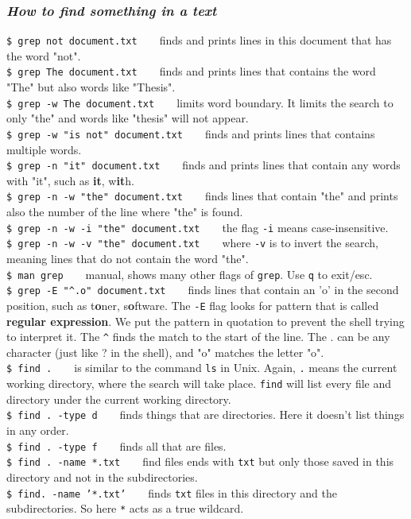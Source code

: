 \documentclass{article}
\begin{document}
\subsubsection{\small\textsl{How to find something in a text }}
\texttt{\$ grep not document.txt} ~ ~ finds and prints lines in this document that has the word "not".\\
\texttt{\$ grep The document.txt} ~ ~ finds and prints lines that contains the word "The" but also words like "Thesis".\\
\texttt{\$ grep -w The document.txt} ~ ~ limits word boundary. It limits the search to only "the" and words like "thesis" will not appear.\\ 
\texttt{\$ grep -w "is not" document.txt} ~ ~ finds and prints lines that contains multiple words. \\
\texttt{\$ grep -n "it" document.txt} ~ ~ finds and prints lines that contain any words with "it", such as \textbf{it}, w\textbf{it}h.\\
\texttt{\$ grep -n -w "the" document.txt}  ~ ~ finds lines that contain "the" and prints also the number of the line where "the" is found.\\
\texttt{\$ grep -n -w -i "the" document.txt} ~ ~ the flag \texttt{-i} means case-insensitive.\\
\texttt{\$ grep -n -w -v "the" document.txt} ~ ~ where \texttt{-v} is to invert the search, meaning lines that do not contain the word "the".\\
\texttt{\$ man grep} ~ ~ manual, shows many other flags of \texttt{grep}. Use \texttt{q} to exit/esc.\\ 
\texttt{\$ grep -E "\textasciicircum.o" document.txt} ~ ~ finds lines that contain an 'o' in the second position, such as t\textbf{o}ner, s\textbf{o}ftware. The \texttt{-E} flag looks for pattern that is called \textbf{regular expression}. We put the pattern in quotation to prevent the shell trying to interpret it. The \texttt{\textasciicircum} finds the match to the start of the line. The . can be any character (just like ? in the shell), and "o" matches the letter "o". \\
\texttt{\$ find .} ~ ~ is similar to the command \texttt{ls} in Unix. Again, \texttt{.} means the current working directory, where the search will take place. \texttt{find} will list every file and directory under the current working directory.\\
\texttt{\$ find . -type d} ~ ~ finds things that are directories. Here it doesn't list things in any order.\\
\texttt{\$ find . -type f} ~ ~ finds all that are files.\\
\texttt{\$ find . -name *.txt} ~ ~ find files ends with \texttt{txt} but only those saved in this directory and not in the subdirectories. \\
\texttt{\$ find. -name '*.txt'} ~ ~ finds \texttt{txt} files in this directory and the subdirectories. So here \texttt{*} acts as a true wildcard.\\
 
\end{document}
